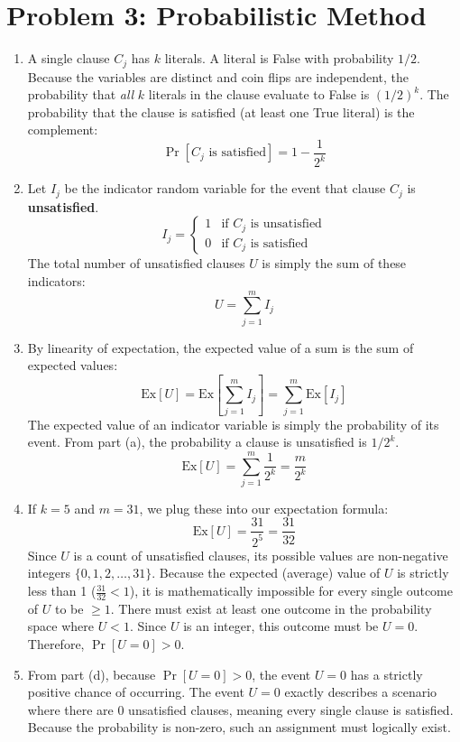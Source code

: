 \documentclass[11pt]{article}
\begin{document}
\vspace{0.5cm}

\section*{Problem 3: Probabilistic Method}
\begin{enumerate}[label=\textbf{(\alph*)}]
    \item A single clause $C_j$ has $k$ literals. A literal is False with probability $1/2$. Because the variables are distinct and coin flips are independent, the probability that \textit{all} $k$ literals in the clause evaluate to False is $(1/2)^k$. 
    The probability that the clause is satisfied (at least one True literal) is the complement:
    $$ \Pr[C_j \text{ is satisfied}] = 1 - \frac{1}{2^k} $$

    \item Let $I_j$ be the indicator random variable for the event that clause $C_j$ is \textbf{unsatisfied}. 
    $$ I_j = \begin{cases} 1 & \text{if } C_j \text{ is unsatisfied} \\ 0 & \text{if } C_j \text{ is satisfied} \end{cases} $$
    The total number of unsatisfied clauses $U$ is simply the sum of these indicators:
    $$ U = \sum_{j=1}^m I_j $$

    \item By linearity of expectation, the expected value of a sum is the sum of expected values:
    $$ \text{Ex}[U] = \text{Ex}\left[ \sum_{j=1}^m I_j \right] = \sum_{j=1}^m \text{Ex}[I_j] $$
    The expected value of an indicator variable is simply the probability of its event. From part (a), the probability a clause is unsatisfied is $1/2^k$.
    $$ \text{Ex}[U] = \sum_{j=1}^m \frac{1}{2^k} = \frac{m}{2^k} $$

    \item If $k=5$ and $m=31$, we plug these into our expectation formula:
    $$ \text{Ex}[U] = \frac{31}{2^5} = \frac{31}{32} $$
    Since $U$ is a count of unsatisfied clauses, its possible values are non-negative integers $\{0, 1, 2, \dots, 31\}$. 
    Because the expected (average) value of $U$ is strictly less than 1 ($\frac{31}{32} < 1$), it is mathematically impossible for every single outcome of $U$ to be $\ge 1$. There must exist at least one outcome in the probability space where $U < 1$. Since $U$ is an integer, this outcome must be $U = 0$. 
    Therefore, $\Pr[U=0] > 0$.

    \item From part (d), because $\Pr[U=0] > 0$, the event $U=0$ has a strictly positive chance of occurring. The event $U=0$ exactly describes a scenario where there are 0 unsatisfied clauses, meaning every single clause is satisfied. 
    Because the probability is non-zero, such an assignment must logically exist.
\end{enumerate}
\end{document}
